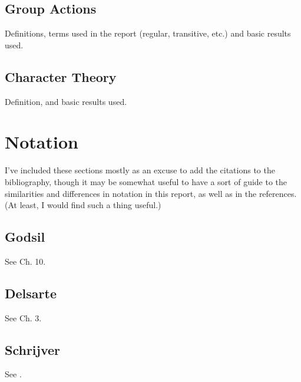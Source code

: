 \documentclass{report}
\begin{document}
  \section{Group Actions}
    Definitions, terms used in the report (regular, transitive, etc.) and basic
    results used.

  \section{Character Theory}
    Definition, and basic results used.

\chapter{Notation}
  I've included these sections mostly as an excuse to add the citations to the
  bibliography, though it may be somewhat useful to have a sort of guide to the
  similarities and differences in notation in this report, as well as in the
  references.  (At least, I would find such a thing useful.)

  \section{Godsil}
    See \cite{godsil} Ch. 10.

  \section{Delsarte}
    See \cite{delsarte} Ch. 3.

  \section{Schrijver}
    See \cite{schrijver}.

\printbibliography[heading=bibintoc]
\end{document}
